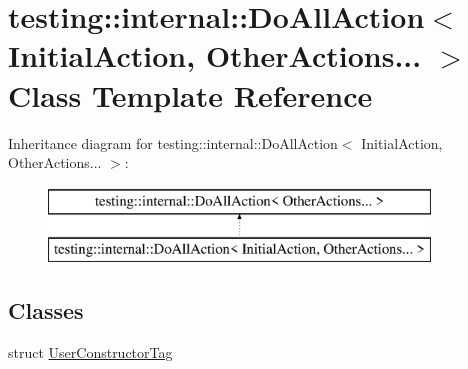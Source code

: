 \hypertarget{classtesting_1_1internal_1_1DoAllAction_3_01InitialAction_00_01OtherActions_8_8_8_01_4}{}\section{testing\+:\+:internal\+:\+:Do\+All\+Action$<$ Initial\+Action, Other\+Actions... $>$ Class Template Reference}
\label{classtesting_1_1internal_1_1DoAllAction_3_01InitialAction_00_01OtherActions_8_8_8_01_4}
Inheritance diagram for testing\+:\+:internal\+:\+:Do\+All\+Action$<$ Initial\+Action, Other\+Actions... $>$\+:\begin{figure}[H]
\begin{center}
\leavevmode
\includegraphics[height=2.000000cm]{classtesting_1_1internal_1_1DoAllAction_3_01InitialAction_00_01OtherActions_8_8_8_01_4}
\end{center}
\end{figure}
\subsection*{Classes}
\begin{DoxyCompactItemize}
\item 
struct \mbox{\hyperlink{structtesting_1_1internal_1_1DoAllAction_3_01InitialAction_00_01OtherActions_8_8_8_01_4_1_1UserConstructorTag}{User\+Constructor\+Tag}}
\end{DoxyCompactItemize}
